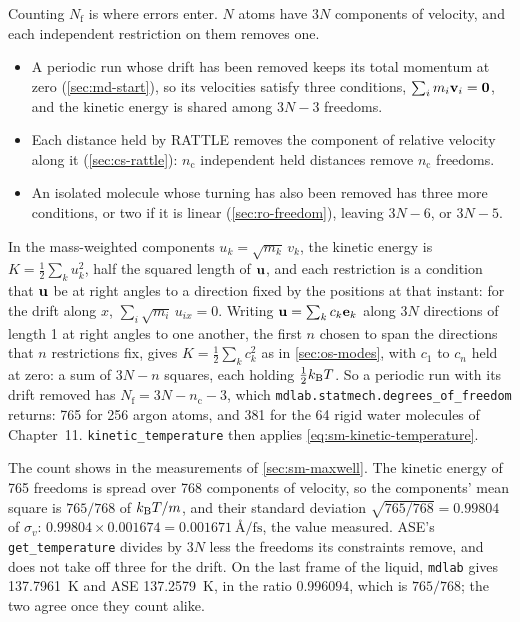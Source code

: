 Counting $N_{\mathrm f}$ is where errors enter. $N$ atoms have $3N$
components of velocity, and each independent restriction on them removes one.
\begin{itemize}
\item A periodic run whose drift has been removed keeps its total
   momentum at zero (\cref{sec:md-start}), so its velocities satisfy three
   conditions, $\sum_im_i\bm{\mathrm{v}}_i = \bm{\mathrm{0}}$, and the kinetic energy is
   shared among $3N - 3$ freedoms.
\item Each distance held by RATTLE removes the component of relative
   velocity along it (\cref{sec:cs-rattle}): $n_{\mathrm c}$ independent held distances
   remove $n_{\mathrm c}$ freedoms.
\item An isolated molecule whose turning has also been removed has three
   more conditions, or two if it is linear (\cref{sec:ro-freedom}),
   leaving $3N - 6$, or $3N - 5$.
\end{itemize}
In the mass-weighted components $u_k = \sqrt{m_k}\,v_k$, the kinetic
energy is $K = \frac12\sum_ku_k^2$, half the squared length of $\bm{\mathrm{u}}$,
and each restriction is a condition that $\bm{\mathrm{u}}$ be at right angles to a
direction fixed by the positions at that instant: for the drift along $x$, $\sum_i\sqrt{m_i}\,u_{ix} = 0$.
Writing $\bm{\mathrm{u}} = \sum_kc_k\bm{\mathrm{e}}_k$ along $3N$ directions of length 1 at
right angles to one another, the first $n$ chosen to span the directions
that $n$ restrictions fix, gives $K = \frac12\sum_kc_k^2$ as in
\cref{sec:os-modes}, with $c_1$ to $c_n$ held at zero: a sum of $3N - n$
squares, each holding $\frac12k_{\mathrm{B}} T$. So a periodic run with its drift
removed has $N_{\mathrm f} = 3N - n_{\mathrm c} - 3$, which
\texttt{mdlab.statmech.degrees\_of\_freedom} returns: 765 for 256 argon
atoms, and 381 for the 64 rigid water molecules of Chapter~11.
\texttt{kinetic\_temperature} then applies \cref{eq:sm-kinetic-temperature}.

The count shows in the measurements of \cref{sec:sm-maxwell}. The
kinetic energy of 765 freedoms is spread over 768 components of
velocity, so the components' mean square is $765/768$ of $k_{\mathrm{B}} T/m$, and
their standard deviation $\sqrt{765/768} = 0.99804$ of $\sigma_v$:
$0.99804\times0.001674 = \SI{0.001671}{\angstrom\per\femto\second}$, the
value measured. ASE's \texttt{get\_temperature} divides by $3N$ less the
freedoms its constraints remove, and does not take off three for the
drift. On the last frame of the liquid, \texttt{mdlab} gives
\SI{137.7961}{\kelvin} and ASE \SI{137.2579}{\kelvin}, in the ratio
0.996094, which is $765/768$; the two agree once they count alike.


